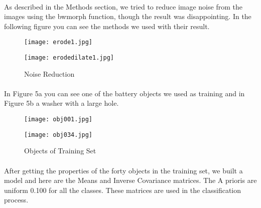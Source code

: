 \documentclass[11pt]{article}
\begin{document}
\paragraph{}
As described in the Methods section, we tried to reduce image noise from the images using the bwmorph function, though the result was disappointing. In the following figure you can see the methods we used with their result. 

\begin{figure}[H]
	\centering
	\begin{minipage}{0.5\textwidth}
		\centering
		\texttt{[image: erode1.jpg]}\\
	\end{minipage}%
	\begin{minipage}{0.5\textwidth}
		\centering
		\texttt{[image: erodedilate1.jpg]}\\
	\end{minipage}%
	\centering
	\caption{Noise Reduction}
\end{figure}

\paragraph{}
In Figure 5a you can see one of the battery objects we used as training and in Figure 5b a washer with a large hole.

\begin{figure}[H]
	\centering
	\begin{minipage}{0.5\textwidth}
		\centering
		\texttt{[image: obj001.jpg]}\\
	\end{minipage}%
	\begin{minipage}{0.5\textwidth}
		\centering
		\texttt{[image: obj034.jpg]}\\
	\end{minipage}%
	\centering
	\caption{Objects of Training Set}
\end{figure}
\newpage
\paragraph{}
After getting the properties of the forty objects in the training set, we built a model and here are the Means and Inverse Covariance matrices. The A prioris are uniform 0.100 for all the classes. These matrices are used in the classification process.
\end{document}
